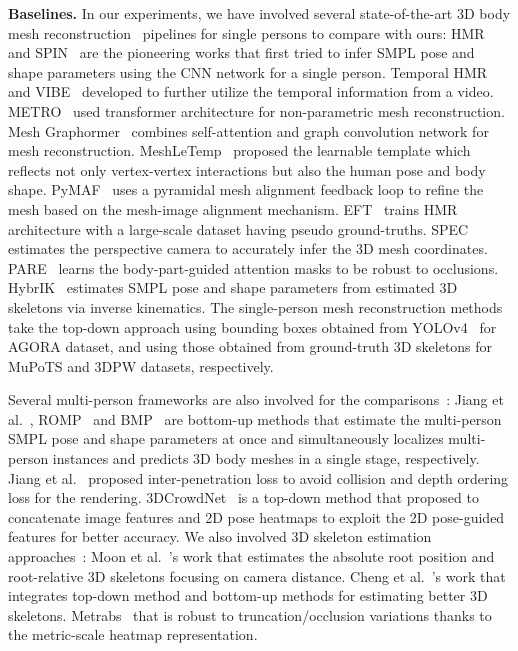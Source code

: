 \documentclass[runningheads]{llncs}
\begin{document}
\noindent \textbf{Baselines.} In our experiments, we have involved several state-of-the-art 3D body mesh reconstruction~\cite{joo2021exemplar,kanazawa2018end,kanazawa2019learning,kocabas2020vibe,kocabas2021pare,kocabas2021spec,kolotouros2019learning,li2021hybrik,lin2021end,lin2021mesh,tran2022meshletemp,zhang2021pymaf} pipelines for single persons to compare with ours: HMR~\cite{kanazawa2018end} and SPIN~\cite{kolotouros2019learning} are the pioneering works that first tried to infer SMPL pose and shape parameters using the CNN network for a single person. Temporal HMR~\cite{kanazawa2019learning} and VIBE~\cite{kocabas2020vibe} developed to further utilize the temporal information from a video. METRO~\cite{lin2021end} used transformer architecture for non-parametric mesh reconstruction. Mesh Graphormer~\cite{lin2021mesh} combines self-attention and graph convolution network for mesh reconstruction. MeshLeTemp~\cite{tran2022meshletemp} proposed the learnable template which reflects not only vertex-vertex interactions but also the human pose and body shape. PyMAF~\cite{zhang2021pymaf} uses a pyramidal mesh alignment feedback loop to refine the mesh based on the mesh-image alignment mechanism. EFT~\cite{joo2021exemplar} trains HMR architecture with a large-scale dataset having pseudo ground-truths. SPEC~\cite{kocabas2021spec} estimates the perspective camera to accurately infer the 3D mesh coordinates. PARE~\cite{kocabas2021pare} learns the body-part-guided attention masks to be robust to occlusions. HybrIK~\cite{li2021hybrik} estimates SMPL pose and shape parameters from estimated 3D skeletons via inverse kinematics. The single-person mesh reconstruction methods take the top-down approach using bounding boxes obtained from YOLOv4~\cite{bochkovskiy2020yolov4} for AGORA dataset, and using those obtained from ground-truth 3D skeletons for MuPoTS and 3DPW datasets, respectively.

Several multi-person frameworks are also involved for the comparisons~\cite{choi20213Dcrowdnet,jiang2020coherent,sun2021monocular,zhang2021body}: Jiang et al.~\cite{jiang2020coherent}, ROMP~\cite{sun2021monocular} and BMP~\cite{zhang2021body} are bottom-up methods that estimate the multi-person SMPL pose and shape parameters at once and simultaneously localizes multi-person instances and predicts 3D body meshes in a single stage, respectively. Jiang et al.~\cite{jiang2020coherent} proposed inter-penetration loss to avoid collision and depth ordering loss for the rendering. 3DCrowdNet~\cite{choi20213Dcrowdnet} is a top-down method that proposed to concatenate image features and 2D pose heatmaps to exploit the 2D pose-guided features for better accuracy. We also involved 3D skeleton estimation approaches~\cite{cheng2021monocular,moon2019camera,sarandi2020metrabs}: Moon et al.~\cite{moon2019camera}'s work that estimates the absolute root position and root-relative 3D skeletons focusing on camera distance. Cheng et al.~\cite{cheng2021monocular}'s work that integrates top-down method and bottom-up methods for estimating better 3D skeletons. Metrabs~\cite{sarandi2020metrabs} that is robust to truncation/occlusion variations thanks to the metric-scale heatmap representation.
\end{document}
